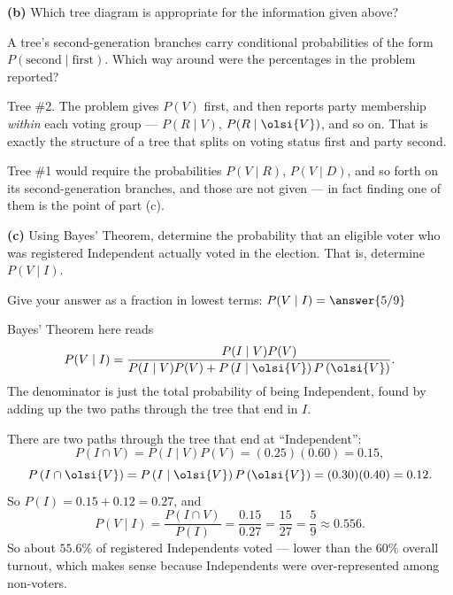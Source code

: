 \documentclass[12pt]{ximera}
\begin{document}
\begin{problem}
\begin{prompt}
\textbf{(b)} Which tree diagram is appropriate for the information given above?

\begin{multipleChoice}
\end{multipleChoice}

\begin{hint}
A tree's second-generation branches carry conditional probabilities of the form
$P(\text{second}\mid\text{first})$. Which way around were the percentages in the
problem reported?
\end{hint}

\begin{feedback}
Tree \#2. The problem gives $P(V)$ first, and then reports party membership
\emph{within} each voting group --- $P(R\mid V)$, $P(R\mid\olsi{V})$, and so on.
That is exactly the structure of a tree that splits on voting status first and party
second.

Tree \#1 would require the probabilities $P(V\mid R)$, $P(V\mid D)$, and so forth on
its second-generation branches, and those are not given --- in fact finding one of
them is the point of part (c).
\end{feedback}
\end{prompt}

\begin{prompt}
\textbf{(c)} Using Bayes' Theorem, determine the probability that an eligible voter
who was registered Independent actually voted in the election. That is, determine
$P(V\mid I)$.

Give your answer as a fraction in lowest terms: $P(V\mid I)=\answer{5/9}$

\begin{hint}
Bayes' Theorem here reads
\[
P(V\mid I)=\frac{P(I\mid V)P(V)}{P(I\mid V)P(V)+P\left(I\mid\olsi{V}\right)P\left(\olsi{V}\right)}.
\]
The denominator is just the total probability of being Independent, found by adding
up the two paths through the tree that end in $I$.
\end{hint}

\begin{feedback}
There are two paths through the tree that end at ``Independent'':
\[
P(I\cap V)=P(I\mid V)P(V)=(0.25)(0.60)=0.15,
\]
\[
P\left(I\cap\olsi{V}\right)=P\left(I\mid\olsi{V}\right)P\left(\olsi{V}\right)=(0.30)(0.40)=0.12.
\]
So $P(I)=0.15+0.12=0.27$, and
\[
P(V\mid I)=\frac{P(I\cap V)}{P(I)}=\frac{0.15}{0.27}=\frac{15}{27}=\frac59\approx 0.556.
\]
So about $55.6\%$ of registered Independents voted --- lower than the $60\%$ overall
turnout, which makes sense because Independents were over-represented among
non-voters.
\end{feedback}
\end{prompt}
\end{problem}
\end{document}
